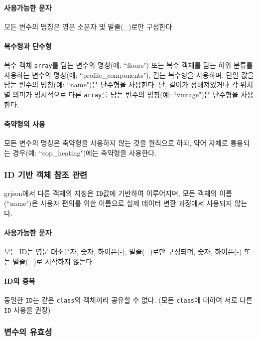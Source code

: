 \paragraph{사용가능한 문자} 모든 변수의 명칭은 영문 소문자 및 밑줄(\_)로만 구성한다.

\paragraph{복수형과 단수형} 복수 객체 \texttt{array}를 담는 변수의 명칭(예: ``floors") 또는 복수 객체를 담는 하위 분류를 사용하는 변수의 명칭(예: ``profile\_components"), 길는 복수형을 사용하며, 단일 값을 담는 변수의 명칭(예: ``name")은 단수형을 사용한다. 단, 길이가 정해져있거나 각 위치별 의미가 명시적으로 다른 \texttt{array}를 담는 변수의 명칭(예: ``vintage")은 단수형을 사용한다.

\paragraph{축약형의 사용} 모든 변수의 명칭은 축약형을 사용하지 않는 것을 원칙으로 하되, 약어 자체로 통용되는 경우(예: ``cop\_heating")에는 축약형을 사용한다.

\subsubsection{ID 기반 객체 참조 관련} \label{subsubsection:ioref:id_description}
grjson에서 다른 객체의 지칭은 \texttt{ID}값에 기반하여 이루어지며, 모든 객체의 이름(``name")은 사용자 편의를 위한 이름으로 실제 데이터 변환 과정에서 사용되지 않는다.

\paragraph{사용가능한 문자} 모든 ID는 영문 대소문자, 숫자, 하이픈(-), 밑줄(\_)로만 구성되며, 숫자, 하이픈(-) 또는 밑줄(\_)로 시작하지 않는다.

\paragraph{ID의 중복} 동일한 \texttt{ID}는 같은 \texttt{class}의 객체끼리 공유할 수 없다. (모든 \texttt{class}에 대하여 서로 다른 \texttt{ID} 사용을 권장)

\subsubsection{변수의 유효성}


